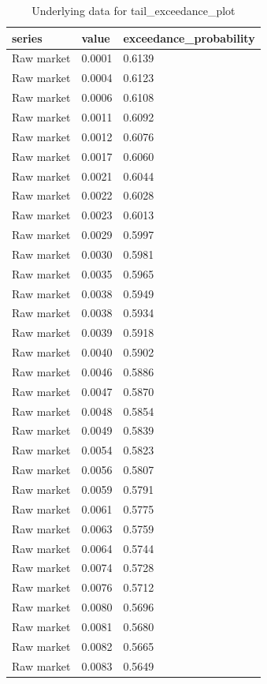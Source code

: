 \begin{table}[htbp]
\centering
\caption{Underlying data for tail_exceedance_plot}
\label{tab:tail_exceedance_plot_data}
\begin{tabular}{lll}
\toprule
\textbf{series} & \textbf{value} & \textbf{exceedance_probability} \\
\midrule
Raw market & 0.0001 & 0.6139 \\
Raw market & 0.0004 & 0.6123 \\
Raw market & 0.0006 & 0.6108 \\
Raw market & 0.0011 & 0.6092 \\
Raw market & 0.0012 & 0.6076 \\
Raw market & 0.0017 & 0.6060 \\
Raw market & 0.0021 & 0.6044 \\
Raw market & 0.0022 & 0.6028 \\
Raw market & 0.0023 & 0.6013 \\
Raw market & 0.0029 & 0.5997 \\
Raw market & 0.0030 & 0.5981 \\
Raw market & 0.0035 & 0.5965 \\
Raw market & 0.0038 & 0.5949 \\
Raw market & 0.0038 & 0.5934 \\
Raw market & 0.0039 & 0.5918 \\
Raw market & 0.0040 & 0.5902 \\
Raw market & 0.0046 & 0.5886 \\
Raw market & 0.0047 & 0.5870 \\
Raw market & 0.0048 & 0.5854 \\
Raw market & 0.0049 & 0.5839 \\
Raw market & 0.0054 & 0.5823 \\
Raw market & 0.0056 & 0.5807 \\
Raw market & 0.0059 & 0.5791 \\
Raw market & 0.0061 & 0.5775 \\
Raw market & 0.0063 & 0.5759 \\
Raw market & 0.0064 & 0.5744 \\
Raw market & 0.0074 & 0.5728 \\
Raw market & 0.0076 & 0.5712 \\
Raw market & 0.0080 & 0.5696 \\
Raw market & 0.0081 & 0.5680 \\
Raw market & 0.0082 & 0.5665 \\
Raw market & 0.0083 & 0.5649 \\

\end{tabular}
\end{table}
